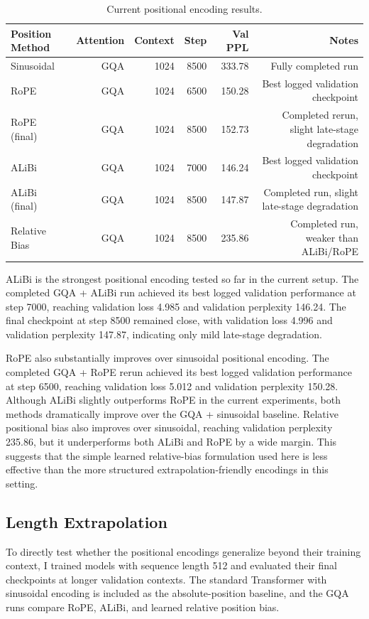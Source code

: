 \documentclass{article}
\begin{document}
\begin{table}[h]
\centering
\begin{tabular}{lrrrrr}
\toprule
Position Method & Attention & Context & Step & Val PPL & Notes \\
\midrule
Sinusoidal & GQA & 1024 & 8500 & 333.78 & Fully completed run \\
RoPE & GQA & 1024 & 6500 & 150.28 & Best logged validation checkpoint \\
RoPE (final) & GQA & 1024 & 8500 & 152.73 & Completed rerun, slight late-stage degradation \\
ALiBi & GQA & 1024 & 7000 & 146.24 & Best logged validation checkpoint \\
ALiBi (final) & GQA & 1024 & 8500 & 147.87 & Completed run, slight late-stage degradation \\
Relative Bias & GQA & 1024 & 8500 & 235.86 & Completed run, weaker than ALiBi/RoPE \\
\bottomrule
\end{tabular}
\caption{Current positional encoding results.}
\end{table}

ALiBi is the strongest positional encoding tested so far in the current setup.
The completed GQA + ALiBi run achieved its best logged validation performance at
step 7000, reaching validation loss 4.985 and validation perplexity 146.24. The
final checkpoint at step 8500 remained close, with validation loss 4.996 and
validation perplexity 147.87, indicating only mild late-stage degradation.

RoPE also substantially improves over sinusoidal positional encoding. The
completed GQA + RoPE rerun achieved its best logged validation performance at
step 6500, reaching validation loss 5.012 and validation perplexity 150.28.
Although ALiBi slightly outperforms RoPE in the current experiments, both
methods dramatically improve over the GQA + sinusoidal baseline. Relative
positional bias also improves over sinusoidal, reaching validation perplexity
235.86, but it underperforms both ALiBi and RoPE by a wide margin. This suggests
that the simple learned relative-bias formulation used here is less effective
than the more structured extrapolation-friendly encodings in this setting.

\subsection{Length Extrapolation}

To directly test whether the positional encodings generalize beyond their
training context, I trained models with sequence length 512 and evaluated their
final checkpoints at longer validation contexts. The standard Transformer with
sinusoidal encoding is included as the absolute-position baseline, and the GQA
runs compare RoPE, ALiBi, and learned relative position bias.
\end{document}
